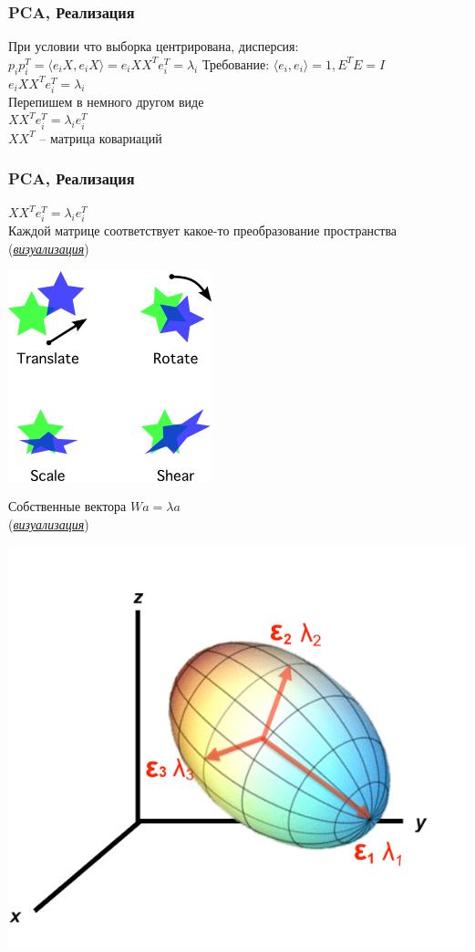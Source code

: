 \documentclass[14pt]{beamer}
\begin{document}
\begin{frame}
\frametitle{PCA, Реализация}
	При условии что выборка центрирована, дисперсия: $ p_ip_i^T=\langle e_iX, e_iX \rangle=e_iXX^Te_i^T=\lambda_i$
	Требование: $\langle e_i,e_i \rangle =1 ,E^TE=I$\\
	$e_iXX^Te_i^T=\lambda_i$\\
	Перепишем в немного другом виде\\
	$XX^Te_i^T=\lambda_ie_i^T$\\
	$XX^T$ -- матрица ковариаций\\[1em]
\end{frame}

\begin{frame}
\frametitle{PCA, Реализация}
	$XX^Te_i^T=\lambda_ie_i^T$\\
	Каждой матрице соответствует какое-то преобразование пространства
	(\href{http://setosa.io/ev/eigenvectors-and-eigenvalues/}{\textit{визуализация}})\\

	\begin{center}
	  \includegraphics[width=0.3\linewidth]{transform.png}\\
	\end{center}
\end{frame}

\begin{frame}
	Собственные вектора $Wa=\lambda a$\\
	(\href{https://www.desmos.com/calculator/ivo6j1pyex}{\textit{визуализация}})\\
	\begin{center}
	  \includegraphics[width=0.5\linewidth]{eigen.png}\\
	\end{center}
\end{frame}
\end{document}
